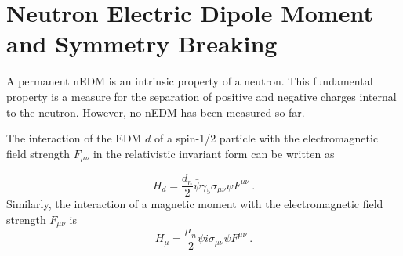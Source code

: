 \section{Neutron Electric Dipole Moment and Symmetry Breaking}
A permanent nEDM is an intrinsic property of a neutron. This
fundamental property is a measure for the separation of positive and
negative charges internal to the neutron. However, no nEDM has been
measured so far.

The interaction of the EDM $d$ of a spin-1/2 particle with the
electromagnetic field strength $F_{\mu \nu}$ in the relativistic
invariant form can be written as

\begin{equation}
\label{eqn:hamiltonianRELelectric}
H_d = \frac{d_n}{2} \bar{\psi} \gamma_5 \sigma_{\mu \nu} \psi F^{\mu \nu}~.
\end{equation}
Similarly, the interaction of a magnetic moment with the
electromagnetic field strength $F_{\mu \nu}$ is
\begin{equation}
\label{eqn:hamiltonianRELmagnetic}
  H_\mu = \frac{\mu_n}{2} \bar{\psi} i \sigma_{\mu \nu} \psi F^{\mu \nu}~.
\end{equation}


